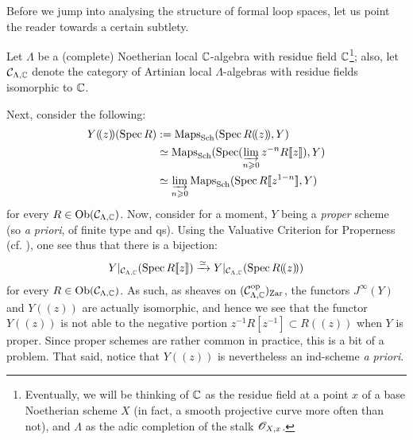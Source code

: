         Before we jump into analysing the structure of formal loop spaces, let us point the reader towards a certain subtlety.
        
        Let $\Lambda$ be a (complete) Noetherian local $\mathbb{C}$-algebra with residue field $\mathbb{C}$\footnote{Eventually, we will be thinking of $\mathbb{C}$ as the residue field at a point $x$ of a base Noetherian scheme $X$ (in fact, a smooth projective curve more often than not), and $\Lambda$ as the adic completion of the stalk $\mathscr{O}_{X, x}$.}; also, let $\mathcal{C}_{\Lambda, \mathbb{C}}$ denote the category of Artinian local $\Lambda$-algebras with residue fields isomorphic to $\mathbb{C}$. 

        Next, consider the following:
            $$
                \begin{aligned}
                    Y(\!(z)\!)(\Spec R) & := \Maps_{\Sch}(\Spec R(\!(z)\!), Y)
                    \\
                    & \cong \Maps_{\Sch}(\Spec( \indlim_{n \geq 0} z^{-n} R[\![z]\!] ), Y)
                    \\
                    & \cong \indlim_{n \geq 0} \Maps_{\Sch}( \Spec R[\![z^{1 - n}]\!], Y )
                \end{aligned}
            $$
        for every $R \in \mathrm{Ob}( \mathcal{C}_{\Lambda, \mathbb{C}} )$. Now, consider for a moment, $Y$ being a \textit{proper} scheme (so \textit{a priori}, of finite type and qs). Using the Valuative Criterion for Properness (cf. \cite[\href{https://stacks.math.columbia.edu/tag/0BX5}{Tag 0BX5}]{stacks}), one see thus that there is a bijection:
            $$Y|_{\mathcal{C}_{\Lambda, \mathbb{C}}}( \operatorname{Spec} R[\![z]\!] ) \xrightarrow[]{\simeq} Y|_{\mathcal{C}_{\Lambda, \mathbb{C}}}( \operatorname{Spec} R(\!(z)\!) )$$
        for every $R \in \mathrm{Ob}( \mathcal{C}_{\Lambda, \mathbb{C}} )$. As such, as sheaves on $(\mathcal{C}_{\Lambda, \mathbb{C}}^{\mathrm{op}})_{\mathrm{Zar}}$, the functors $J^{\infty}(Y)$ and $Y(\!(z)\!)$ are actually isomorphic, and hence we see that the functor $Y(\!(z)\!)$ is not able to  the negative portion $z^{-1} R[z^{-1}] \subset R(\!(z)\!)$ when $Y$ is proper. Since proper schemes are rather common in practice, this is a bit of a problem. That said, notice that $Y(\!(z)\!)$ is nevertheless an ind-scheme \textit{a priori}.

